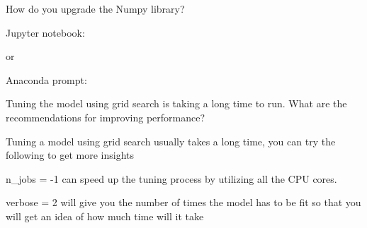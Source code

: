 	\begin{qanda}
		\begin{question}
How do you upgrade the Numpy library?
		\end{question}

		\begin{answer}
 Jupyter notebook: 

\noindent or

\noindent Anaconda prompt: 
		\end{answer}
	\end{qanda}

	\begin{qanda}
		\begin{question}
			Tuning the model using grid search is taking a long time to run. What are the recommendations for improving performance?
		\end{question}

		\begin{answer}
Tuning a model using grid search usually takes a long time, you can try the following to get more insights

\noindent{}

\noindent n\_jobs = -1 can speed up the tuning process by utilizing all the CPU cores.

\noindent verbose = 2 will give you the number of times the model has to be fit so that you will get an idea of how much time will it take
		\end{answer}
	\end{qanda}


